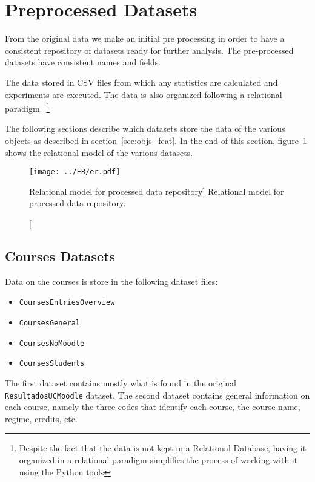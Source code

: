 \section{Preprocessed Datasets}
\label{sec:preproc_dataset}

From the original data we make an initial pre processing in order to have a
consistent repository of datasets ready for further analysis. The pre-processed
datasets have consistent names and fields.

The data stored in CSV files from which any statistics are calculated and
experiments are executed. The data is also organized following a relational
paradigm.~\footnote{Despite the fact that the data is not kept in a Relational
Database, having it organized in a relational paradigm simplifies the process
of working with it using the Python tools}

The following sections describe which datasets store the data of the various
objects as described in section~\ref{sec:objs_feat}. In the end of this
section, figure~\ref{fig:er} shows the relational model of the various datasets.

\begin{figure}[h!]
    \centering

    \texttt{[image: ../ER/er.pdf]}

    \caption
        [Relational model for processed data repository]
        {Relational model for processed data repository.}

    \label{fig:er}
\end{figure}

\subsection{Courses Datasets}

Data on the courses is store in the following dataset files:

\begin{itemize}
    \item \texttt{CoursesEntriesOverview}
    \item \texttt{CoursesGeneral}
    \item \texttt{CoursesNoMoodle}
    \item \texttt{CoursesStudents}
\end{itemize}

The first dataset contains mostly what is found in the original
\texttt{ResultadosUCMoodle} dataset. The second dataset contains general
information on each course, namely the three codes that identify each course,
the course name, regime, credits, etc.

